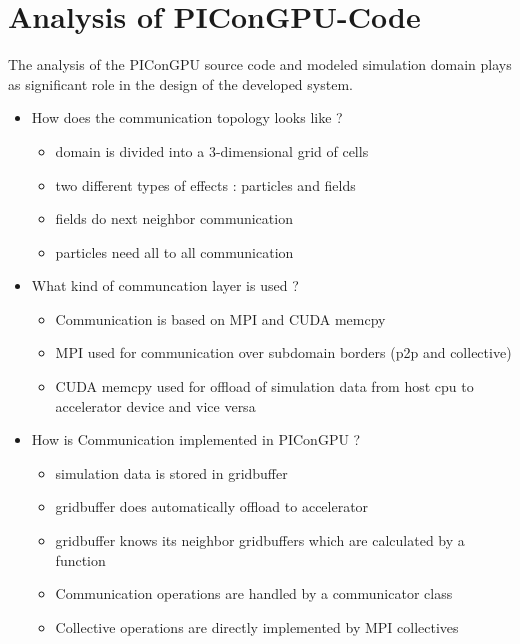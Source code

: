 \section{Analysis of PIConGPU-Code}
\label{sec:picongpu_analysis}

The analysis of the PIConGPU source code and modeled simulation domain
plays as significant role in the design of the developed system.


\begin{itemize}
\item How does the communication topology looks like ?
  \begin{itemize}
  \item domain is divided into a 3-dimensional grid of cells
  \item two different types of effects : particles and fields
  \item fields do next neighbor communication 
  \item particles need all to all communication
  \end{itemize}
   


  \item What kind of communcation layer is used ?
    \begin{itemize}
      \item Communication is based on MPI and CUDA memcpy
      \item MPI used for communication over subdomain borders (p2p and collective)
      \item CUDA memcpy used for offload of simulation data from 
        host cpu to accelerator device and vice versa
    \end{itemize}

  \item How is Communication implemented in PIConGPU ?
    \begin{itemize}
      \item simulation data is stored in gridbuffer
      \item gridbuffer does automatically offload to accelerator
      \item gridbuffer knows its neighbor gridbuffers which
        are calculated by a function
      \item Communication operations are handled by a communicator class
      \item Collective operations are directly implemented by
        MPI collectives
    \end{itemize}

\end{itemize}


